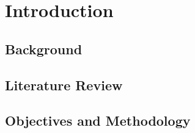\chapter{Introduction}

\section{Background}\label{sec:background}
  

\section{Literature Review}\label{sec:literature-review}
  

\section{Objectives and Methodology}\label{sec:objectives-and-methodology}
  